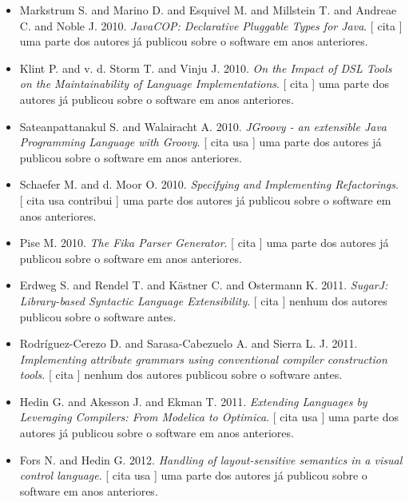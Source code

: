 \begin{itemize}
      [
          cita
      ]
uma parte dos autores já publicou sobre o software em anos anteriores.
\item Markstrum S. and Marino D. and Esquivel M. and Millstein T. and Andreae C. and Noble J.
      2010.
        \textit{ JavaCOP: Declarative Pluggable Types for Java}.
      [
          cita
      ]
uma parte dos autores já publicou sobre o software em anos anteriores.
\item Klint P. and v. d. Storm T. and Vinju J.
      2010.
        \textit{ On the Impact of DSL Tools on the Maintainability of Language Implementations}.
      [
          cita
      ]
uma parte dos autores já publicou sobre o software em anos anteriores.
\item Sateanpattanakul S. and Walairacht A.
      2010.
        \textit{ JGroovy - an extensible Java Programming Language with Groovy}.
      [
          cita
          usa
      ]
uma parte dos autores já publicou sobre o software em anos anteriores.
\item Schaefer M. and d. Moor O.
      2010.
        \textit{ Specifying and Implementing Refactorings}.
      [
          cita
          usa
          contribui
      ]
uma parte dos autores já publicou sobre o software em anos anteriores.
\item Pise M.
      2010.
        \textit{ The Fika Parser Generator}.
      [
          cita
      ]
uma parte dos autores já publicou sobre o software em anos anteriores.
\item Erdweg S. and Rendel T. and K\"{a}stner C. and Ostermann K.
      2011.
        \textit{ SugarJ: Library-based Syntactic Language Extensibility}.
      [
          cita
      ]
nenhum dos autores publicou sobre o software antes.
\item Rodríguez-Cerezo D. and Sarasa-Cabezuelo A. and Sierra L. J.
      2011.
        \textit{ Implementing attribute grammars using conventional compiler construction tools}.
      [
          cita
      ]
nenhum dos autores publicou sobre o software antes.
\item Hedin G. and Akesson J. and Ekman T.
      2011.
        \textit{ Extending Languages by Leveraging Compilers: From Modelica to Optimica}.
      [
          cita
          usa
      ]
uma parte dos autores já publicou sobre o software em anos anteriores.
\item Fors N. and Hedin G.
      2012.
        \textit{ Handling of layout-sensitive semantics in a visual control language}.
      [
          cita
          usa
      ]
uma parte dos autores já publicou sobre o software em anos anteriores.

\end{itemize}
